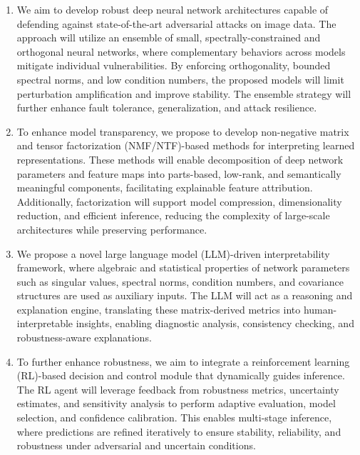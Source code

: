 \documentclass[a4paper,11pt]{article}
\begin{document}
\begin{enumerate}
	\item We aim to develop robust deep neural network architectures capable of defending against state-of-the-art adversarial attacks on image data. The approach will utilize an ensemble of small, spectrally-constrained and orthogonal neural networks, where complementary behaviors across models mitigate individual vulnerabilities. By enforcing orthogonality, bounded spectral norms, and low condition numbers, the proposed models will limit perturbation amplification and improve stability. The ensemble strategy will further enhance fault tolerance, generalization, and attack resilience.

	\item To enhance model transparency, we propose to develop non-negative matrix and tensor factorization (NMF/NTF)-based methods for interpreting learned representations. These methods will enable decomposition of deep network parameters and feature maps into parts-based, low-rank, and semantically meaningful components, facilitating explainable feature attribution. Additionally, factorization will support model compression, dimensionality reduction, and efficient inference, reducing the complexity of large-scale architectures while preserving performance.
	\item We propose a novel large language model (LLM)-driven interpretability framework, where algebraic and statistical properties of network parameters such as singular values, spectral norms, condition numbers, and covariance structures are used as auxiliary inputs. The LLM will act as a reasoning and explanation engine, translating these matrix-derived metrics into human-interpretable insights, enabling diagnostic analysis, consistency checking, and robustness-aware explanations.
	\item To further enhance robustness, we aim to integrate a reinforcement learning (RL)-based decision and control module that dynamically guides inference. The RL agent will leverage feedback from robustness metrics, uncertainty estimates, and sensitivity analysis to perform adaptive evaluation, model selection, and confidence calibration. This enables multi-stage inference, where predictions are refined iteratively to ensure stability, reliability, and robustness under adversarial and uncertain conditions.
\end{enumerate}


\end{document}
